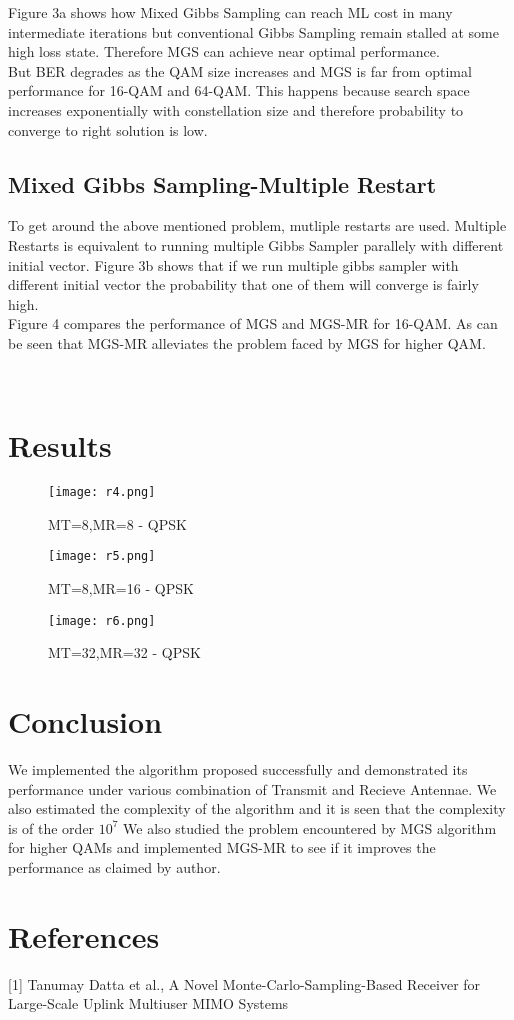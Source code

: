 \documentclass{article}
\begin{document}
Figure 3a shows how Mixed Gibbs Sampling can reach ML cost in many intermediate
iterations but conventional Gibbs Sampling remain stalled at some high loss state.
Therefore MGS can achieve near optimal performance. \\
But BER degrades as the QAM size increases and MGS is far from optimal performance 
for 16-QAM and 64-QAM. This happens because search space increases exponentially with
constellation size and therefore probability to converge to right solution is low.

\subsection*{Mixed Gibbs Sampling-Multiple Restart}
To get around the above mentioned problem, mutliple restarts are used. Multiple
Restarts is equivalent to running multiple Gibbs Sampler parallely with different
initial vector. Figure 3b shows that if we run multiple gibbs sampler with different
initial vector the probability that one of them will converge is fairly high.\\
Figure 4 compares the performance of MGS and MGS-MR for 16-QAM. As can be seen that
MGS-MR alleviates the problem faced by MGS for higher QAM.\\
\begin{figure}[h]
\centering
{}~
%
\caption{}
\end{figure}

\section*{Results}
\begin{figure}[H]
\centering
\texttt{[image: r4.png]}
\caption{MT=8,MR=8 - QPSK}
\label{fig5:Stalling Problem}
\end{figure}
\begin{figure}[H]
\centering
\texttt{[image: r5.png]}
\caption{MT=8,MR=16 - QPSK}
\label{fig6:Stalling Problem}
\end{figure}
\begin{figure}[H]
\centering
\texttt{[image: r6.png]}
\caption{MT=32,MR=32 - QPSK}
\label{fig7:Stalling Problem}
\end{figure}

\section*{Conclusion}
We implemented the algorithm proposed successfully and demonstrated its performance
under various combination of Transmit and Recieve Antennae. We also estimated the
complexity of the algorithm and it is seen that the complexity is of the order $10^7$
We also studied the problem encountered by MGS algorithm for higher QAMs and 
implemented MGS-MR to see if it improves the performance as claimed by author.\\
\section*{References}
[1] Tanumay Datta et al., A Novel Monte-Carlo-Sampling-Based Receiver 
for Large-Scale Uplink Multiuser MIMO Systems \\
\end{document}
